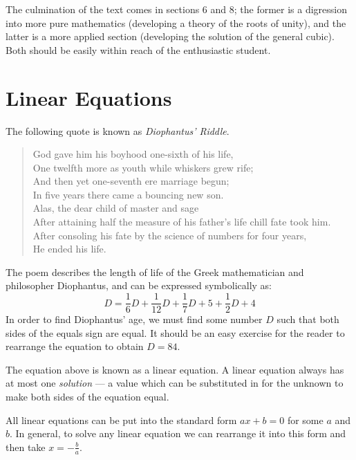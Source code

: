\documentclass[a4paper,10pt,titlepage]{article}
\theoremstyle{definition}
\begin{document}
The culmination of the text comes in sections 6 and 8; the former is a digression
into more pure mathematics (developing a theory of the roots of unity), and the latter
is a more applied section (developing the solution of the general cubic). Both should
be easily within reach of the enthusiastic student.

\section{Linear Equations}

The following quote is known as \emph{Diophantus' Riddle}.

\begin{quote}
  God gave him his boyhood one-sixth of his life,\\
  One twelfth more as youth while whiskers grew rife;\\
  And then yet one-seventh ere marriage begun;\\
  In five years there came a bouncing new son.\\
  Alas, the dear child of master and sage\\
  After attaining half the measure of his father's life chill fate took him.\\
  After consoling his fate by the science of numbers for four years,\\
  He ended his life.
\end{quote}

The poem describes the length of life of the Greek mathematician and philosopher
Diophantus, and can be expressed symbolically as:
\begin{displaymath}
  \label{eqn:diophantus}
  D = \frac{1}{6}D + \frac{1}{12}D + \frac{1}{7}D + 5 + \frac{1}{2}D + 4
\end{displaymath}
In order to find Diophantus' age, we must find some number $ D $ such that both
sides of the equals sign are equal. It should be an easy exercise for the reader
to rearrange the equation to obtain $ D = 84 $.

The equation above is known as a linear equation. A linear equation
always has at most one \emph{solution} --- a value which can be substituted in for
the unknown to make both sides of the equation equal.

All linear equations can be put into the standard form $ ax + b = 0 $ for some $ a $ and
$ b $. In general, to solve any linear equation we can rearrange it into this form
and then take $ x = -\frac{b}{a} $.
\end{document}

